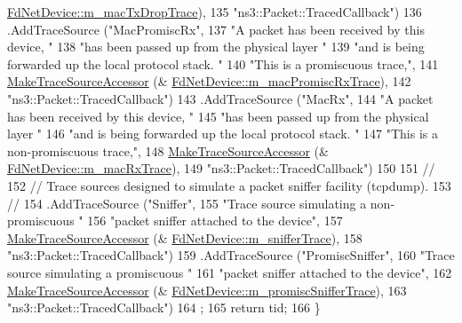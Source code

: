 \begin{DoxyCode}
      \hyperlink{classns3_1_1FdNetDevice_ad204b6948cb00479cc229465c6c07ebb}{FdNetDevice::m\_macTxDropTrace}),
135                      \textcolor{stringliteral}{"ns3::Packet::TracedCallback"})
136     .AddTraceSource (\textcolor{stringliteral}{"MacPromiscRx"},
137                      \textcolor{stringliteral}{"A packet has been received by this device, "}
138                      \textcolor{stringliteral}{"has been passed up from the physical layer "}
139                      \textcolor{stringliteral}{"and is being forwarded up the local protocol stack.  "}
140                      \textcolor{stringliteral}{"This is a promiscuous trace,"},
141                      \hyperlink{group__tracing_gab21a770b9855af4e8f69f7531ea4a6b0}{MakeTraceSourceAccessor} (&
      \hyperlink{classns3_1_1FdNetDevice_ac0fbee33fa2dc3d5349f33f794364fdb}{FdNetDevice::m\_macPromiscRxTrace}),
142                      \textcolor{stringliteral}{"ns3::Packet::TracedCallback"})
143     .AddTraceSource (\textcolor{stringliteral}{"MacRx"},
144                      \textcolor{stringliteral}{"A packet has been received by this device, "}
145                      \textcolor{stringliteral}{"has been passed up from the physical layer "}
146                      \textcolor{stringliteral}{"and is being forwarded up the local protocol stack.  "}
147                      \textcolor{stringliteral}{"This is a non-promiscuous trace,"},
148                      \hyperlink{group__tracing_gab21a770b9855af4e8f69f7531ea4a6b0}{MakeTraceSourceAccessor} (&
      \hyperlink{classns3_1_1FdNetDevice_a5d526995e92ac4957170d9b8a680bad1}{FdNetDevice::m\_macRxTrace}),
149                      \textcolor{stringliteral}{"ns3::Packet::TracedCallback"})
150 
151     \textcolor{comment}{//}
152     \textcolor{comment}{// Trace sources designed to simulate a packet sniffer facility (tcpdump).}
153     \textcolor{comment}{//}
154     .AddTraceSource (\textcolor{stringliteral}{"Sniffer"},
155                      \textcolor{stringliteral}{"Trace source simulating a non-promiscuous "}
156                      \textcolor{stringliteral}{"packet sniffer attached to the device"},
157                      \hyperlink{group__tracing_gab21a770b9855af4e8f69f7531ea4a6b0}{MakeTraceSourceAccessor} (&
      \hyperlink{classns3_1_1FdNetDevice_a821080a2cc1253e22918e8fcedcfbe58}{FdNetDevice::m\_snifferTrace}),
158                      \textcolor{stringliteral}{"ns3::Packet::TracedCallback"})
159     .AddTraceSource (\textcolor{stringliteral}{"PromiscSniffer"},
160                      \textcolor{stringliteral}{"Trace source simulating a promiscuous "}
161                      \textcolor{stringliteral}{"packet sniffer attached to the device"},
162                      \hyperlink{group__tracing_gab21a770b9855af4e8f69f7531ea4a6b0}{MakeTraceSourceAccessor} (&
      \hyperlink{classns3_1_1FdNetDevice_a7f43138ecf824b335eb80eeebdb91eb6}{FdNetDevice::m\_promiscSnifferTrace}),
163                      \textcolor{stringliteral}{"ns3::Packet::TracedCallback"})
164   ;
165   \textcolor{keywordflow}{return} tid;
166 \}
\end{DoxyCode}


